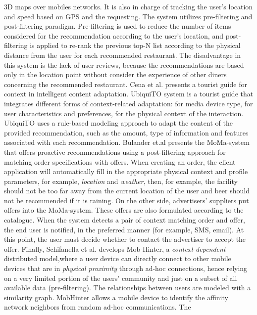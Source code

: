 3D maps over mobiles networks. It is also in charge of tracking the
user’s location and speed based on GPS and the requesting. The system
utilizes pre-filtering and post-filtering paradigm. Pre-filtering is
used to reduce the number of items considered for the recommendation
according to the user’s location, and  post-filtering is applied to
re-rank the previous top-N list according to the physical distance
from the user for each recommended restaurant. The disadvantage in this
system is the lack of user reviews, because the recommendations are
based only in the location point without consider the experience of
other diners concerning the recommended restaurant. 
Cena et al.\cite{cena2006integrating} presents a tourist guide for
context in intelligent content adaptation. UbiquiTO system is a
tourist guide that integrates different forms of context-related
adaptation: for media device type, for user characteristics and
preferences, for the physical context of the interaction. UbiquiTO uses
a rule-based modeling approach to adapt the content of the provided
recommendation, such as the amount, type of information and features
associated with each recommendation. 
Bulander et.al\cite{bulander2005comparison} presents the MoMa-system that
offers proactive recommendations using a post-filtering approach for
matching order specifications with offers. When creating an order, the
client application will automatically fill in the appropriate physical
context and profile parameters, for example, \textit{location} and \textit{weather},
then, for example, the facility should not be too far away from the
current location of the user and beer should not be
recommended if it is raining. On the other side, advertisers’
suppliers put offers into the MoMa-system. These offers are also
formulated according to the catalogue. When the system detects a pair
of context matching order and offer, the end user is notified, in the
preferred manner (for example, SMS, email). At this point, the user
must decide whether to contact the advertiser to accept the offer.
Finally, Schifanella et al.\cite{schifanella2008mobhinter} develops
Mob-Hinter, a \textit{context-dependent} distributed model,where a user device
can directly connect to other mobile devices that are in \textit{physical
proximity} through ad-hoc connections, hence relying on a very limited
portion of the users’ community and just on a subset of all available
data (pre-filtering). The relationships between users are modeled with
a similarity graph. MobHinter allows a mobile device to identify the
affinity network neighbors from random ad-hoc communications. The
